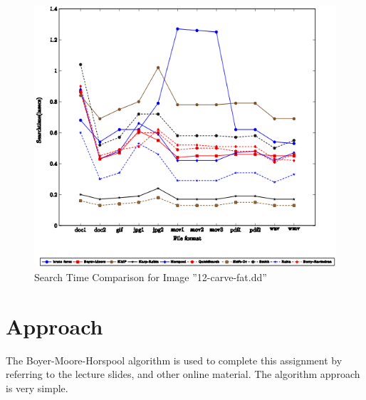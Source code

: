 \documentclass[12pt]{article}
\begin{document}
\begin{figure}[p]
\centering
\includegraphics[width=\textwidth]{./images/Search Time Comparison for Image ”12-carve-fat.dd”.png}
\caption{Search Time Comparison for Image ”12-carve-fat.dd” \textcite{yi_chang_2015}}\label{carve_fat12_chart}
\end{figure}

\newpage

\section{Approach}
The Boyer-Moore-Horspool algorithm is used to complete this assignment by referring to the lecture slides, and other online material. The algorithm approach is very simple.
\end{document}
